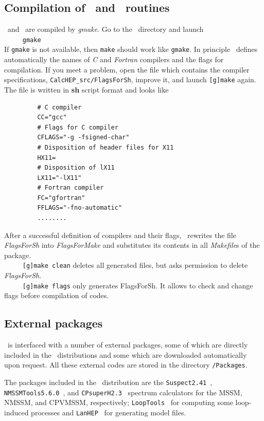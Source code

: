 \documentclass[12pt,a4paper]{article}
\begin{document}
\subsection{Compilation of \calchep\ and \micro\ routines}
   \calchep\ and \micro\ are compiled by {\it gmake}. Go to the \micro\ directory
and launch\\
\verb|     gmake|\\
If {\tt gmake} is not available, then {\tt make} should work like {\tt gmake}.
In principle \micro\ defines automatically the names of {\it C} and {\it
Fortran} compilers and the flags for
compilation. If you meet a  problem, open the file which contains the compiler specifications, 
\verb|CalcHEP_src/FlagsForSh|,
 improve it, and launch {\tt [g]make} 
again. The file  is written in {\bf sh} script format and looks like
\begin{verbatim}
         # C compiler
         CC="gcc"
         # Flags for C compiler
         CFLAGS="-g -fsigned-char"
         # Disposition of header files for X11
         HX11=
         # Disposition of lX11
         LX11="-lX11"
         # Fortran compiler
         FC="gfortran"
         FFLAGS="-fno-automatic"
         ........
\end{verbatim}
After a successful definition of compilers and their flags,   \micro\ rewrites the file 
 {\it FlagsForSh} into {\it FlagsForMake} and substitutes its contents in all {\it
Makefile}s of the package.\\
\verb|     [g]make clean|    deletes all generated files, but asks permission to
delete {\it FlagsForSh}.\\
\verb|     [g]make flags|       only generates FlagsForSh. It allows to check and
change  flags before compilation of codes.


\subsection{External packages}

\micro\ is interfaced with a number of external packages, some of which are directly included in the \micro\ distributions and some which are downloaded automatically upon request. All these external codes are stored in the directory {\tt /Packages}.
 
The packages included in the \micro\ distribution are 
the {\tt Suspect2.41}~\cite{Djouadi:2002ze},  {\tt NMSSMTools5.6.0}~\cite{nmssmtools,Ellwanger:2005dv}, and {\tt CPsuperH2.3}~\cite{CPSUPERH,Lee:2003nta} spectrum calculators for the 
MSSM, NMSSM, and CPVMSSM, respectively; {\tt LoopTools}~\cite{Hahn:1998yk} for computing some loop-induced processes 
and {\tt LanHEP}~\cite{Semenov:2014rea} for generating model files. 
\end{document}
